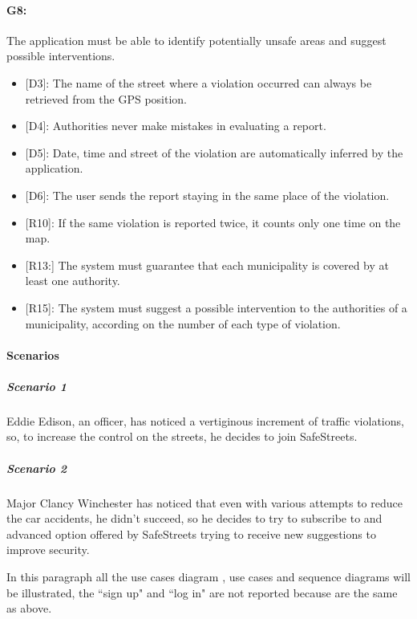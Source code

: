 \documentclass[12pt,a4paper]{report}
\begin{document}
			\paragraph {G8:} The application must be able to identify potentially unsafe areas and suggest possible interventions.
				\begin{itemize}
					\item{[D3]}: The name of the street where a violation occurred can always be retrieved from the GPS position.
			 		\item{[D4]}: Authorities never make mistakes in evaluating a report.
					\item{[D5]}: Date, time and street of the violation are automatically inferred by the application.
			 		\item{[D6]}: The user sends the report staying in the same place of the violation.
				\end{itemize}
				\begin{itemize}
					\item{[R10]}: If the same violation is reported twice, it counts only one time on the map.
					\item{[R13:]} The system must guarantee that each municipality is covered by at least one authority.
					\item{[R15]}: The system must suggest a possible intervention to the authorities of a municipality, according on the number of each type of violation.
				\end{itemize}

\paragraph{Scenarios}
				\subparagraph{Scenario 1}
					Eddie Edison, an officer, has noticed a vertiginous increment of traffic violations, so, to increase the control
					on the streets, he decides to join SafeStreets.
					
				\subparagraph{Scenario 2}
					Major Clancy Winchester has noticed that even with various attempts to reduce the car accidents, he didn't	succeed, so he decides to try to subscribe to and advanced option offered by SafeStreets trying to receive
					new suggestions to improve security.
					
				In this paragraph all the use cases diagram , use cases and sequence diagrams will be illustrated, the ``sign up" and ``log in"
				are not reported because are the same as above.
\end{document}
